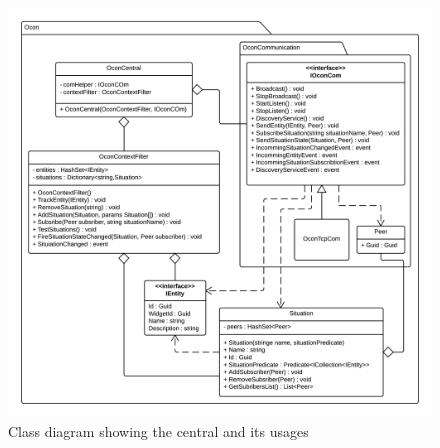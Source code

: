 \documentclass[../report.tex]{subfiles}
\begin{document}
\begin{figure}[H]
\hspace{-20px}
\includegraphics[width=470px]{oconclassdiagram.png}
\caption{Class diagram showing the central and its usages}
\label{fig:oconclassdiagram}
\end{figure}
\end{document}
